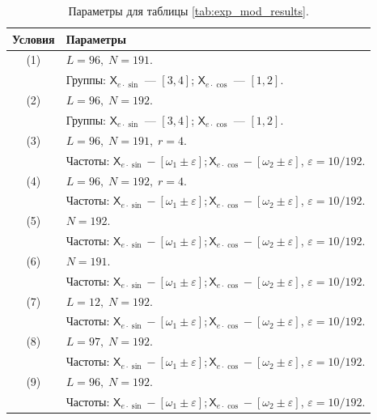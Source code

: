 \documentclass[12pt, specialist, subf
]{disser}
\theoremstyle{definition}
\newcommand{\TS}{\mathsf{X}}
\begin{document}
\begin{table}[H]
  \caption{Параметры для таблицы \ref{tab:exp_mod_results}.}
  \centering
  \label{tab:exp_mod_parameters}
  \begin{tabularx}{\textwidth}{|c|X|}
    \hline
    \textbf{Условия} & \textbf{Параметры} \\
    \hline
    (1) & \(L = 96,\; N = 191\). \\ 
        & Группы: \(\TS_{e \cdot \sin}\) —  \([3,4]\); \(\TS_{e \cdot \cos}\) —  \([1,2]\). \\
    \hline
    (2) & \(L = 96,\; N = 192\). \\ 
        & Группы: \(\TS_{e \cdot \sin}\) —  \([3,4]\); \(\TS_{e \cdot \cos}\) —  \([1,2]\). \\
    \hline
    (3) & \(L = 96,\; N = 191,\; r = 4\). \\ 
       & Частоты: $\TS_{e \cdot \sin} - [\omega_1 \pm \varepsilon]; \TS_{e \cdot \cos} - [\omega_2 \pm \varepsilon]$, $\varepsilon = 10/192$. \\
    \hline
    (4) & \(L = 96,\; N = 192,\; r = 4\). \\ 
        & Частоты: $\TS_{e \cdot \sin} - [\omega_1 \pm \varepsilon]; \TS_{e \cdot \cos} - [\omega_2 \pm \varepsilon]$, $\varepsilon = 10/192$. \\
    \hline
    (5) & \(N = 192\). \\ 
        & Частоты: $\TS_{e \cdot \sin} - [\omega_1 \pm \varepsilon]; \TS_{e \cdot \cos} - [\omega_2 \pm \varepsilon]$, $\varepsilon = 10/192$. \\
    \hline
    (6) & \(N = 191\). \\ 
        & Частоты: $\TS_{e \cdot \sin} - [\omega_1 \pm \varepsilon]; \TS_{e \cdot \cos} - [\omega_2 \pm \varepsilon]$, $\varepsilon = 10/192$. \\
    \hline
    (7) & \(L = 12,\; N = 192\). \\ 
        & Частоты: $\TS_{e \cdot \sin} - [\omega_1 \pm \varepsilon]; \TS_{e \cdot \cos} - [\omega_2 \pm \varepsilon]$, $\varepsilon = 10/192$. \\
    \hline
    (8) & \(L = 97,\; N = 192\). \\ 
       & Частоты: $\TS_{e \cdot \sin} - [\omega_1 \pm \varepsilon]; \TS_{e \cdot \cos} - [\omega_2 \pm \varepsilon]$, $\varepsilon = 10/192$. \\
    \hline
    (9) & \(L = 96,\; N = 192\). \\ 
        & Частоты: $\TS_{e \cdot \sin} - [\omega_1 \pm \varepsilon]; \TS_{e \cdot \cos} - [\omega_2 \pm \varepsilon]$, $\varepsilon = 10/192$. \\
    \hline
  \end{tabularx}
\end{table}
\end{document}

